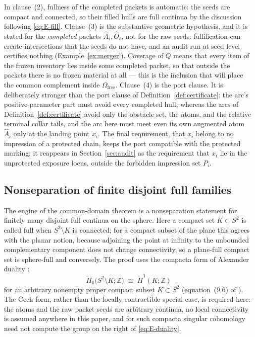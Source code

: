 \documentclass[11pt,reqno]{amsart}
\theoremstyle{definition}
\theoremstyle{remark}
\newcommand{\Z}{\mathbb Z}
\newcommand{\Omfree}{\Omega_{\mathrm{free}}}
\begin{document}
In clause~(2), fullness of the completed packets is automatic: the seeds are compact
and connected, so their filled hulls are full continua by the discussion following
\eqref{eq:E-fill}. Clause~(3) is the substantive geometric hypothesis, and it is
stated for the \emph{completed} packets $\widehat A_i,\widehat O_\ell$, not for the
raw seeds: fullification can create intersections that the seeds do not have, and an
audit run at seed level certifies nothing (Example~\ref{ex:merger}). Coverage of $Q$
means that every item of the frozen inventory lies inside some completed packet, so
that outside the packets there is no frozen material at all --- this is the inclusion
that will place the common complement inside $\Omfree$. Clause~(4) is the port
clause. It is deliberately stronger than the port clause of
Definition~\ref{def:certificate}: the arc's positive-parameter part must avoid every
completed hull, whereas the arcs of Definition~\ref{def:certificate} avoid only the
obstacle set, the atoms, and the relative terminal collar tails, and the arc here must meet
even its own augmented atom $\widehat A_i$ only at the landing point $x_i$. The final requirement,
that $x_i$ belong to no impression of a protected chain, keeps the port compatible with
the protected marking; it reappears in Section~\ref{sec:audit} as the requirement
that $x_i$ lie in the unprotected exposure locus, outside the forbidden impression
set $P_i$.

\subsection{Nonseparation of finite disjoint full families}\label{subsec:E-duality}

The engine of the common-domain theorem is a nonseparation statement for finitely
many disjoint full continua on the sphere. Here a compact set $K\subset S^2$ is
called full when $S^2\setminus K$ is connected; for a compact subset of the plane
this agrees with the planar notion, because adjoining the point at infinity to the
unbounded complementary component does not change connectivity, so a plane-full
compact set is sphere-full and conversely. The proof uses the compacta form of
Alexander duality \cite[Chapter~6]{Spa66}:
\begin{equation}\label{eq:E-duality}
\widetilde H_0\bigl(S^2\setminus K;\Z\bigr)\;\cong\;\check H^1(K;\Z)
\end{equation}
for an arbitrary nonempty proper compact subset $K\subset S^2$ (equation~(9.6) of
\cite{MWman}). The \v{C}ech form, rather than the locally contractible special case,
is required here: the atoms and the raw packet seeds are arbitrary continua,
no local connectivity is assumed anywhere in this paper, and for such compacta
singular cohomology need not compute the group on the right of
\eqref{eq:E-duality}.
\end{document}
